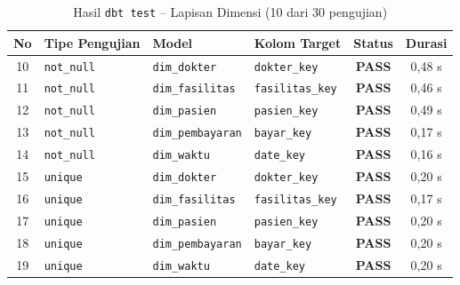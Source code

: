 \begin{table}[H]
\centering
\caption{Hasil \texttt{dbt test} -- Lapisan Dimensi (10 dari 30 pengujian)}
\small
\begin{tabularx}{\linewidth}{cp{2.8cm}p{3.8cm}Xcc}
\toprule
\textbf{No} & \textbf{Tipe Pengujian} & \textbf{Model} & \textbf{Kolom Target} & \textbf{Status} & \textbf{Durasi} \\
\midrule
10 & \texttt{not\_null} & \texttt{dim\_dokter}     & \texttt{dokter\_key}     & \textcolor{green!60!black}{\textbf{PASS}} & 0,48 s \\
11 & \texttt{not\_null} & \texttt{dim\_fasilitas}  & \texttt{fasilitas\_key}  & \textcolor{green!60!black}{\textbf{PASS}} & 0,46 s \\
12 & \texttt{not\_null} & \texttt{dim\_pasien}     & \texttt{pasien\_key}     & \textcolor{green!60!black}{\textbf{PASS}} & 0,49 s \\
13 & \texttt{not\_null} & \texttt{dim\_pembayaran} & \texttt{bayar\_key}      & \textcolor{green!60!black}{\textbf{PASS}} & 0,17 s \\
14 & \texttt{not\_null} & \texttt{dim\_waktu}      & \texttt{date\_key}       & \textcolor{green!60!black}{\textbf{PASS}} & 0,16 s \\
\midrule
15 & \texttt{unique}    & \texttt{dim\_dokter}     & \texttt{dokter\_key}     & \textcolor{green!60!black}{\textbf{PASS}} & 0,20 s \\
16 & \texttt{unique}    & \texttt{dim\_fasilitas}  & \texttt{fasilitas\_key}  & \textcolor{green!60!black}{\textbf{PASS}} & 0,17 s \\
17 & \texttt{unique}    & \texttt{dim\_pasien}     & \texttt{pasien\_key}     & \textcolor{green!60!black}{\textbf{PASS}} & 0,20 s \\
18 & \texttt{unique}    & \texttt{dim\_pembayaran} & \texttt{bayar\_key}      & \textcolor{green!60!black}{\textbf{PASS}} & 0,20 s \\
19 & \texttt{unique}    & \texttt{dim\_waktu}      & \texttt{date\_key}       & \textcolor{green!60!black}{\textbf{PASS}} & 0,20 s \\
\bottomrule
\end{tabularx}
\end{table}
 
